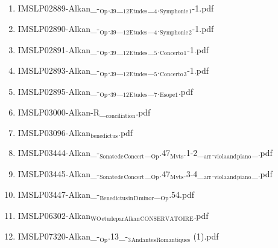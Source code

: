 \documentclass[11pt]{article}
\begin{document}
\begin{enumerate}
\begin{enumerate}
\item IMSLP02889-Alkan\_-$_{\text{Op}}$.$_{\text{39}}$\_$_{\text{12}}$$_{\text{Etudes}}$\_$_{\text{4}}$.$_{\text{Symphonie}}$$_{\text{1}}$-1.pdf
\label{sec-1-1-1-1-44-4-8}

\item IMSLP02890-Alkan\_-$_{\text{Op}}$.$_{\text{39}}$\_$_{\text{12}}$$_{\text{Etudes}}$\_$_{\text{4}}$.$_{\text{Symphonie}}$$_{\text{2}}$-1.pdf
\label{sec-1-1-1-1-44-4-9}

\item IMSLP02891-Alkan\_-$_{\text{Op}}$.$_{\text{39}}$\_$_{\text{12}}$$_{\text{Etudes}}$\_$_{\text{5}}$.$_{\text{Concerto}}$$_{\text{1}}$-1.pdf
\label{sec-1-1-1-1-44-4-10}

\item IMSLP02893-Alkan\_-$_{\text{Op}}$.$_{\text{39}}$\_$_{\text{12}}$$_{\text{Etudes}}$\_$_{\text{5}}$.$_{\text{Concerto}}$$_{\text{3}}$-1.pdf
\label{sec-1-1-1-1-44-4-11}

\item IMSLP02895-Alkan\_-$_{\text{Op}}$.$_{\text{39}}$\_$_{\text{12}}$$_{\text{Etudes}}$\_$_{\text{7}}$.$_{\text{Esope1}}$.pdf
\label{sec-1-1-1-1-44-4-12}

\item IMSLP03000-Alkan-R\_$_{\text{conciliation}}$.pdf
\label{sec-1-1-1-1-44-4-13}

\item IMSLP03096-Alkan$_{\text{benedictus}}$.pdf
\label{sec-1-1-1-1-44-4-14}

\item IMSLP03444-Alkan\_-$_{\text{Sonate}}$$_{\text{de}}$$_{\text{Concert}}$\_$_{\text{Op}}$.47$_{\text{Mvts}}$.1-2\_$_{\text{arr}}$.$_{\text{viola}}$$_{\text{and}}$$_{\text{piano}}$\_.pdf
\label{sec-1-1-1-1-44-4-15}

\item IMSLP03445-Alkan\_-$_{\text{Sonate}}$$_{\text{de}}$$_{\text{Concert}}$\_$_{\text{Op}}$.47$_{\text{Mvts}}$.3-4\_$_{\text{arr}}$.$_{\text{viola}}$$_{\text{and}}$$_{\text{piano}}$\_.pdf
\label{sec-1-1-1-1-44-4-16}

\item IMSLP03447-Alkan\_-$_{\text{Benedictus}}$$_{\text{in}}$$_{\text{D}}$$_{\text{minor}}$\_$_{\text{Op}}$.54.pdf
\label{sec-1-1-1-1-44-4-17}

\item IMSLP06302-Alkan$_{\text{WO}}$$_{\text{etudeparAlkan}}$$_{\text{CONSERVATOIRE}}$.pdf
\label{sec-1-1-1-1-44-4-18}

\item IMSLP07320-Alkan\_-$_{\text{Op}}$.13\_-$_{\text{3}}$$_{\text{Andantes}}$$_{\text{Romantiques}}$ (1).pdf
\label{sec-1-1-1-1-44-4-19}


\end{enumerate}
\end{enumerate}
\end{document}
